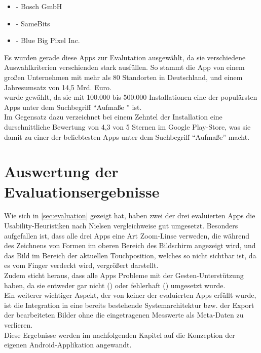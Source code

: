 \begin{itemize}
  \item \mm{} - Bosch GmbH
  \item \ms{} - SameBits
  \item \pm{} - Blue Big Pixel Inc.
\end{itemize}

\noindent
{} 
Es wurden gerade diese Apps zur Evalutation ausgewählt, da sie verschiedene Auswahlkriterien verschienden stark ausfüllen.
So stammt die App \mm{} von einem großen Unternehmen mit mehr als 80 Standorten in Deutschland, und einem Jahresumsatz von 14,5 Mrd. Euro. \\
\ms{} wurde gewählt, da sie mit 100.000 bis 500.000 Installationen eine der populärsten Apps unter dem Suchbegriff ``Aufmaße '' ist. \\
Im Gegensatz dazu verzeichnet \pm{} bei einem Zehntel der Installation eine durschnittliche Bewertung von 4,3 von 5 Sternen im Google Play-Store, was sie damit zu einer der beliebtesten Apps unter dem Suchbegriff ``Aufmaße'' macht.





\section{Auswertung der Evaluationsergebnisse}
Wie sich in \autoref{sec:evaluation} gezeigt hat, haben zwei der drei evaluierten Apps die Usability-Heuristiken nach Nielsen vergleichweise gut umgesetzt.
Besonders aufgefallen ist, dass alle drei Apps eine Art Zoom-Linse verweden, die während des Zeichnens von Formen im oberen Bereich des Bildschirm angezeigt wird, und das Bild im Bereich der aktuellen Touchposition, welches so nicht sichtbar ist, da es vom Finger verdeckt wird, vergrößert darstellt. \\

Zudem sticht heraus, dass alle Apps Probleme mit der Gesten-Unterstützung haben, da sie entweder gar nicht () oder fehlerhaft () umgesetzt wurde. \\

Ein weiterer wichtiger Aspekt, der von keiner der evaluierten Apps erfüllt wurde, ist die Integration in eine bereits bestehende Systemarchitektur bzw. der Export der bearbeiteten Bilder ohne die eingetragenen Messwerte als Meta-Daten zu verlieren. \\

Diese Ergebnisse werden im nachfolgenden Kapitel auf die Konzeption der eigenen Android-Applikation angewandt.
